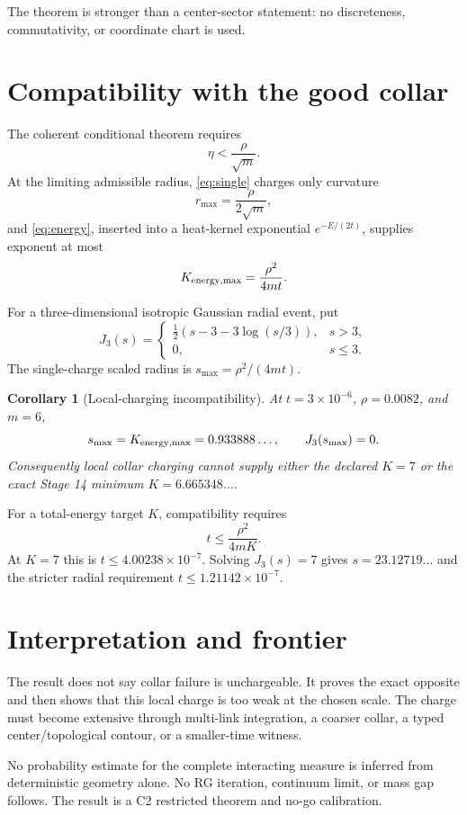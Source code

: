 \documentclass[11pt]{article}
\newtheorem{corollary}[theorem]{Corollary}
\begin{document}
The theorem is stronger than a center-sector statement: no discreteness,
commutativity, or coordinate chart is used.

\section{Compatibility with the good collar}

The coherent conditional theorem requires
\begin{equation}
 \eta<\frac{\rho}{\sqrt m}.
 \label{eq:good}
\end{equation}
At the limiting admissible radius, \eqref{eq:single} charges only curvature
\[
 r_{\max}=\frac{\rho}{2\sqrt m},
\]
and \eqref{eq:energy}, inserted into a heat-kernel exponential
$e^{-E/(2t)}$, supplies exponent at most
\begin{equation}
 K_{\rm energy,max}=\frac{\rho^2}{4mt}.
 \label{eq:kmax}
\end{equation}

For a three-dimensional isotropic Gaussian radial event, put
\[
 J_3(s)=\begin{cases}
 \tfrac12(s-3-3\log(s/3)),&s>3,\\
 0,&s\leq3.
 \end{cases}
\]
The single-charge scaled radius is $s_{\max}=\rho^2/(4mt)$.

\begin{corollary}[Local-charging incompatibility]
At $t=3\times10^{-6}$, $\rho=0.0082$, and $m=6$,
\[
 s_{\max}=K_{\rm energy,max}=0.933888\ldots,
 \qquad J_3(s_{\max})=0.
\]
Consequently local collar charging cannot supply either the declared
$K=7$ or the exact Stage 14 minimum $K=6.665348\ldots$.
\end{corollary}

For a total-energy target $K$, compatibility requires
\begin{equation}
 t\leq \frac{\rho^2}{4mK}.
\end{equation}
At $K=7$ this is $t\leq4.00238\times10^{-7}$.  Solving
$J_3(s)=7$ gives $s=23.12719\ldots$ and the stricter radial requirement
$t\leq1.21142\times10^{-7}$.

\section{Interpretation and frontier}

The result does not say collar failure is unchargeable.  It proves the exact
opposite and then shows that this local charge is too weak at the chosen scale.
The charge must become extensive through multi-link integration, a coarser
collar, a typed center/topological contour, or a smaller-time witness.

No probability estimate for the complete interacting measure is inferred
from deterministic geometry alone.  No RG iteration, continuum limit, or
mass gap follows.  The result is a C2 restricted theorem and no-go
calibration.
\end{document}
